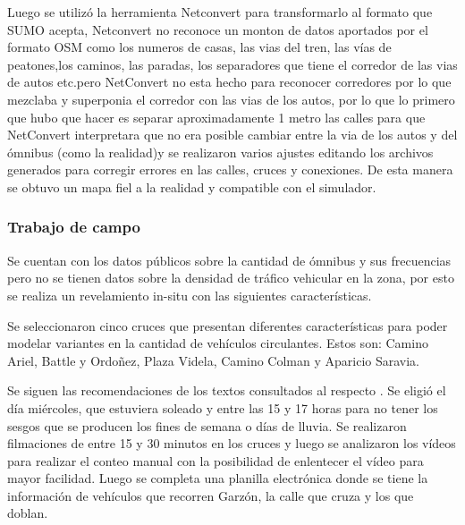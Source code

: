 Luego se utilizó la herramienta Netconvert para transformarlo al formato que SUMO acepta, Netconvert no reconoce un monton de datos aportados por el formato OSM como los numeros de casas, las vias del tren, las vías de peatones,los caminos, las paradas, los separadores que tiene el corredor de las vias de autos etc.pero NetConvert no esta hecho para reconocer corredores por lo que mezclaba y superponia el corredor con las vias de los autos, por lo que lo primero que hubo que hacer es separar aproximadamente 1 metro las calles para que NetConvert interpretara que no era posible cambiar entre la via de los autos y del ómnibus (como la realidad)y se realizaron varios ajustes editando los archivos generados para corregir errores en las calles, cruces y conexiones. De esta manera se obtuvo un mapa fiel a la realidad y compatible con el simulador.


\subsubsection{Trabajo de campo}
Se cuentan con los datos públicos sobre la cantidad de  ómnibus y sus frecuencias pero no se tienen datos sobre la densidad de tráfico vehicular en la zona, por esto se realiza un revelamiento in-situ con las siguientes características.

Se seleccionaron cinco cruces que presentan diferentes características para poder modelar variantes en la cantidad de vehículos circulantes.
Estos son: Camino Ariel, Battle y Ordoñez, Plaza Videla, Camino Colman y Aparicio Saravia. 

Se siguen las recomendaciones de los textos consultados al respecto \citep{ConteoTrafico}. Se eligió el día miércoles, que estuviera soleado y entre las 15 y 17 horas para no tener los sesgos que se producen los fines de semana o días de lluvia.
Se realizaron filmaciones de entre 15 y 30 minutos en los cruces y luego se analizaron los vídeos para realizar el conteo manual con la posibilidad de enlentecer el vídeo para mayor facilidad. Luego se completa una planilla electrónica donde se tiene la información de vehículos que recorren Garzón, la calle que cruza y los que doblan. 

